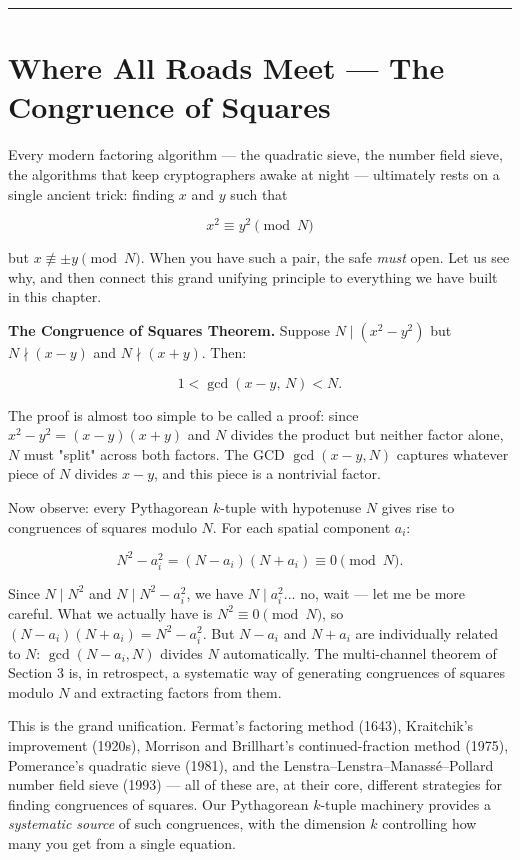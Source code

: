 \documentclass[12pt, letterpaper, openany]{book}
\theoremstyle{definition}
\theoremstyle{remark}
\begin{document}
\bigskip\noindent\rule{\textwidth}{0.4pt}\bigskip



\section*{Where All Roads Meet --- The Congruence of Squares}


Every modern factoring algorithm --- the quadratic sieve, the number field sieve, the algorithms that keep cryptographers awake at night --- ultimately rests on a single ancient trick: finding $x$ and $y$ such that

\[
x^2 \equiv y^2 \pmod{N}
\]

but $x \not\equiv \pm y \pmod{N}$. When you have such a pair, the safe \textit{must} open. Let us see why, and then connect this grand unifying principle to everything we have built in this chapter.

\textbf{The Congruence of Squares Theorem.} Suppose $N \mid (x^2 - y^2)$ but $N \nmid (x - y)$ and $N \nmid (x + y)$. Then:

\[
1 < \gcd(x - y, \, N) < N.
\]

The proof is almost too simple to be called a proof: since $x^2 - y^2 = (x - y)(x + y)$ and $N$ divides the product but neither factor alone, $N$ must "split" across both factors. The GCD $\gcd(x - y, N)$ captures whatever piece of $N$ divides $x - y$, and this piece is a nontrivial factor.

Now observe: every Pythagorean $k$-tuple with hypotenuse $N$ gives rise to congruences of squares modulo $N$. For each spatial component $a_i$:

\[
N^2 - a_i^2 = (N - a_i)(N + a_i) \equiv 0 \pmod{N}.
\]

Since $N \mid N^2$ and $N \mid N^2 - a_i^2$, we have $N \mid a_i^2$... no, wait --- let me be more careful. What we actually have is $N^2 \equiv 0 \pmod{N}$, so $(N - a_i)(N + a_i) = N^2 - a_i^2$. But $N - a_i$ and $N + a_i$ are individually related to $N$: $\gcd(N - a_i, N)$ divides $N$ automatically. The multi-channel theorem of Section 3 is, in retrospect, a systematic way of generating congruences of squares modulo $N$ and extracting factors from them.

This is the grand unification. Fermat's factoring method (1643), Kraitchik's improvement (1920s), Morrison and Brillhart's continued-fraction method (1975), Pomerance's quadratic sieve (1981), and the Lenstra--Lenstra--Manassé--Pollard number field sieve (1993) --- all of these are, at their core, different strategies for finding congruences of squares. Our Pythagorean $k$-tuple machinery provides a \textit{systematic source} of such congruences, with the dimension $k$ controlling how many you get from a single equation.
\end{document}
